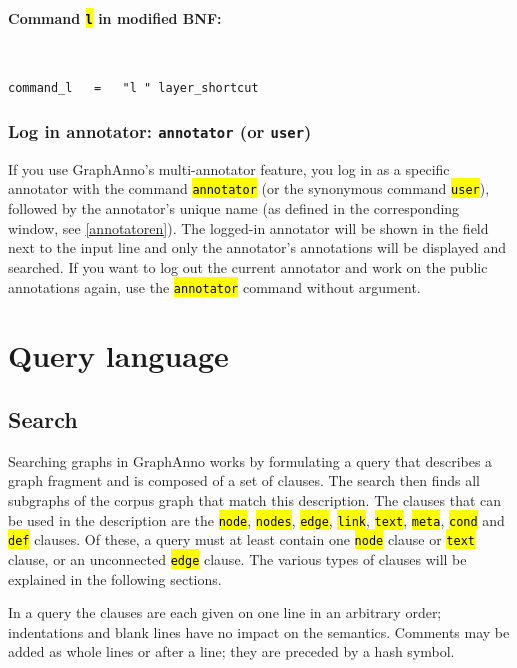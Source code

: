 \documentclass[12pt]{scrartcl}
\newcommand{\code}[1]{\hl{\texttt{#1}}}
\begin{document}
\paragraph*{Command \code{l} in modified BNF:}
~
\begin{lstlisting}
command_l   =   "l " layer_shortcut
\end{lstlisting}



\subsubsection{Log in annotator: \texttt{annotator} (or \texttt{user})}

If you use GraphAnno’s multi-annotator feature, you log in as a specific annotator with the command \code{annotator} (or the synonymous command \code{user}), followed by the annotator’s unique name (as defined in the corresponding window, see \ref{annotatoren}).
The logged-in annotator will be shown in the field next to the input line and only the annotator’s annotations will be displayed and searched.
If you want to log out the current annotator and work on the public annotations again, use the \code{annotator} command without argument.



\section{Query language}\label{querylanguage}

\subsection{Search}

Searching graphs in GraphAnno works by formulating a query that describes a graph fragment and is composed of a set of clauses.
The search then finds all subgraphs of the corpus graph that match this description.
The clauses that can be used in the description are the \code{node}, \code{nodes}, \code{edge}, \code{link}, \code{text}, \code{meta}, \code{cond} and \code{def} clauses.
Of these, a query must at least contain one \code{node} clause or \code{text} clause, or an unconnected \code{edge} clause.
The various types of clauses will be explained in the following sections.

In a query the clauses are each given on one line in an arbitrary order; indentations and blank lines have no impact on the semantics.
Comments may be added as whole lines or after a line; they are preceded by a hash symbol.
\end{document}

